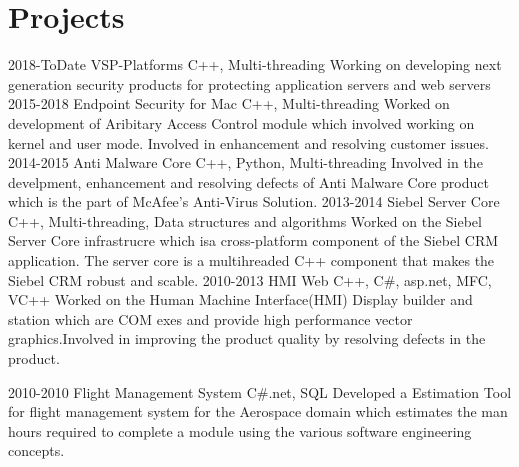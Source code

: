\documentclass[]{kartikkumar-cv}
\begin{document}
\section{Projects}

\begin{entrylist}
	\entry
	{2018-ToDate}
	{VSP-Platforms}
	{C++, Multi-threading}
	{Working on developing next generation security products for protecting application servers and web servers}
	 \entry
	{2015-2018}
	{Endpoint Security for Mac}
	{C++, Multi-threading}
	{Worked on development of Aribitary Access Control module which involved working on kernel and user mode.
	Involved in enhancement and resolving customer issues.}
  \entry
    {2014-2015}
    {Anti Malware Core}
    {C++, Python, Multi-threading}
    {Involved in the develpment, enhancement and resolving defects of Anti
    Malware Core product which is the part of McAfee's Anti-Virus Solution.}
  \entry
    {2013-2014}
    {Siebel Server Core}
    {C++, Multi-threading, Data structures and algorithms }
    {Worked on the Siebel Server Core infrastrucre which isa cross-platform
    component of the Siebel CRM application. The server core is a multihreaded
    C++ component that makes the Siebel CRM robust and scable.}
  \entry
    {2010-2013}
    {HMI Web}
    {C++, C\#, asp.net, MFC, VC++}
    {Worked on the Human Machine Interface(HMI) Display builder and station
    which are COM exes and provide high performance vector graphics.Involved in improving the product quality by resolving defects in the product.}
    
  \entry
  {2010-2010}
  {Flight Management System}
  {C\#.net, SQL}
  {Developed a Estimation Tool for flight management system for the
  Aerospace domain which estimates the man hours required to complete a
  module using the various software engineering concepts.}
    
\end{entrylist}
\end{document}
